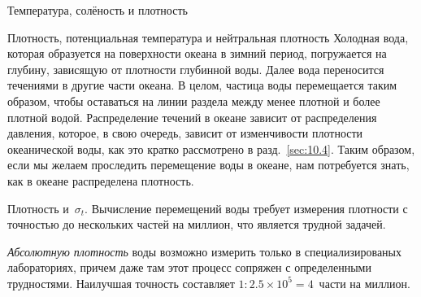 \begin{chapter}{Температура, солёность и плотность}
\begin{section}{Плотность, потенциальная температура и нейтральная плотность}
Холодная вода, которая образуется на поверхности океана в зимний период,
погружается на глубину, зависящую от плотности глубинной воды. Далее вода
переносится течениями в другие части океана. В целом, частица воды 
перемещается таким образом, чтобы оставаться на линии раздела между 
менее плотной и более плотной водой. Распределение течений в океане зависит 
от распределения давления, которое, в свою очередь, зависит от изменчивости
плотности океанической воды, как это кратко рассмотрено в разд.~\ref{sec:10.4}.
Таким образом, если мы желаем проследить перемещение воды в океане, нам
потребуется знать, как в океане распределена плотность.
%

\begin{paragraph}{Плотность и~$\sigma_t$.}
Вычисление перемещений воды требует измерения плотности с точностью до 
нескольких частей на миллион, что является трудной задачей.
%

\emph{Абсолютную плотность} воды возможно измерить только в специализированых 
лабораториях, причем даже там этот процесс сопряжен с определенными 
трудностями. Наилучшая точность составляет $1:2.5\times 10^5 = 4$~части 
на миллион. 
%


\end{paragraph}
\end{section}
\end{chapter}
